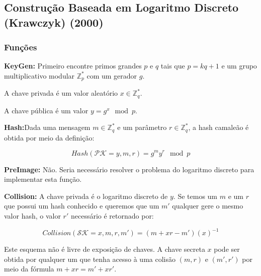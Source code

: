 \documentclass[a4paper]{article}
\begin{document}
    
    \subsection{Construção Baseada em Logaritmo Discreto (Krawczyk) (2000)
      \cite{krawczyk}}
    
    \subsubsection{Funções}
    
    \textbf{KeyGen: }Primeiro encontre primos grandes $p$ e $q$ tais que
    $p = kq+1$ e um grupo multiplicativo modular $\mathbb{Z}^{*}_p$ com um
    gerador $g$.
    
    A chave privada é um valor aleatório $x \in \mathbb{Z}^{*}_q$.
    
    A chave pública é um valor $y = g^x \mod p$.
    
    \textbf{Hash:}Dada uma mensagem $m \in \mathbb{Z}^{*}_q$ e um
    parâmetro $r\in \mathbb{Z}^{*}_q$, a hash camaleão é obtida por meio
    da definição:
    
    $$
    Hash(\mathcal{PK}=y, m, r) = g^my^r \mod p
    $$
    
    \textbf{PreImage:} Não. Seria necessário resolver o problema do
    logaritmo discreto para implementar esta função.
    
    \textbf{Collision:} A chave privada é o logaritmo discreto de $y$. Se
    temos um $m$ e um $r$ que possui um hash conhecido e queremos que um
    $m'$ qualquer gere o mesmo valor hash, o valor $r'$ necessário é
    retornado por:
    
    $$
    Collision(\mathcal{SK}=x, m, r, m') = (m+xr-m')(x)^{-1}
    $$
    
    Este esquema não é livre de exposição de chaves. A chave secreta $x$
    pode ser obtida por qualquer um que tenha acesso à uma colisão $(m,
    r)$ e $(m', r')$ por meio da fórmula $m+xr = m'+xr'$.
    
    
    
    
\end{document}

